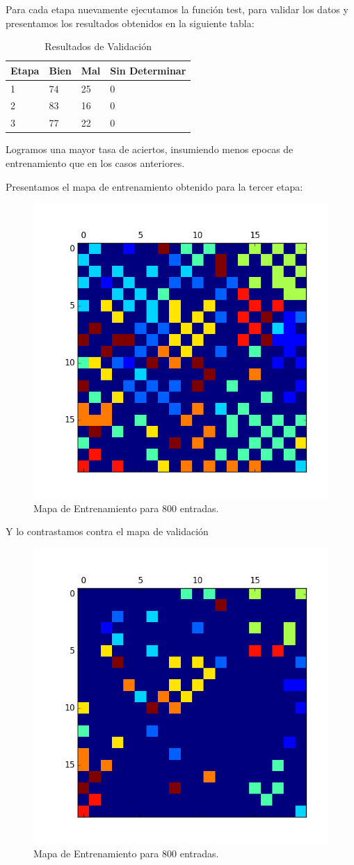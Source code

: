 Para cada etapa nuevamente ejecutamos la función test, para validar los datos
y presentamos los resultados obtenidos en la siguiente tabla:


\begin{table}[htbp]
	\begin{center}
	\begin{tabular}{|l|l|l|l|}
		\hline
		Etapa & Bien & Mal & Sin Determinar 	\\
							\hline \hline
		1     & 74   & 25  & 0 			\\ \hline
		2     & 83   & 16  & 0	 		\\ \hline
		3     & 77   & 22  & 0			\\ \hline
	\end{tabular}
	\caption{Resultados de Validación}
	\label{tabla:entrenamiento 50 entradas}
	\end{center}
\end{table}


Logramos una mayor tasa de aciertos, insumiendo menos epocas de entrenamiento
que en los casos anteriores.

Presentamos el mapa de entrenamiento obtenido para la tercer etapa:

\begin{figure}[H]
  \centering
  \includegraphics[width=0.5\columnwidth]{secciones/graficos/kohonen/mapaentrenamiento800.png}
  \caption{Mapa de Entrenamiento para 800 entradas.}
  \label{fig:mapa train 800}
\end{figure}

Y lo contrastamos contra el mapa de validación

\begin{figure}[H]
  \centering
  \includegraphics[width=0.5\columnwidth]{secciones/graficos/kohonen/mapavalidacion800.png}
  \caption{Mapa de Entrenamiento para 800 entradas.}
  \label{fig:mapa train 800}
\end{figure}


